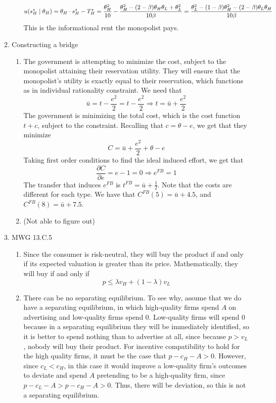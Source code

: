\documentclass[12pt]{article}
\begin{document}
\begin{enumerate}
\begin{enumerate}
		\[
		u(s^\star_H \mid \theta_H) = \theta_H \cdot s^\star_H - T^\star_H = \frac{\theta_H^2}{10} - \frac{\theta_H^2 - (2-\beta)\theta_H\theta_L + \theta_L^2}{10\beta} = \frac{\theta_L^2 - (1-\beta)\theta_H^2 - (2-\beta)\theta_L\theta_H}{10\beta}
		\]
		This is the informational rent the monopolist pays.
	\end{enumerate}
	\item Constructing a bridge
	\begin{enumerate}
		\item The government is attempting to minimize the cost, subject to the monopolist attaining their reservation utility. They will ensure that the monopolist's utility is exactly equal to their reservation, which functions as in individual rationality constraint. We need that
		\[
		\bar{u} = t  - \frac{e^2}{2} = t  - \frac{e^2}{2} \Longrightarrow t = \bar{u} + \frac{e^2}{2}
		\]
		The government is minimizing the total cost, which is the cost function $t + c$, subject to the constraint. Recalling that $c = \theta - e$, we get that they minimize
		\[
		C = \bar{u} + \frac{e^2}{2} + \theta - e
		\]
		Taking first order conditions to find the ideal induced effort, we get that
		\[
		\frac{\partial C}{\partial e} = e - 1 = 0 \Longrightarrow e^{FB} = 1
		\]
		The transfer that induces $e^{FB}$ is $t^{FB} = \bar{u} + \frac{1}{2}$. Note that the costs are different for each type. We have that $C^{FB}(5) = \bar{u} + 4.5$, and $C^{FB}(8) = \bar{u} + 7.5$.
		\item (Not able to figure out)
	\end{enumerate}
	\item MWG 13.C.5
	\begin{enumerate}
		\item Since the consumer is risk-neutral, they will buy the product if and only if its expected valuation is greater than its price. Mathematically, they will buy if and only if
		\[
		p \le \lambda v_H + (1-\lambda)v_L
		\]
		\item There can be no separating equilibrium. To see why, assume that we do have a separating equilibrium, in which high-quality firms spend $A$ on advertising and low-quality firms spend 0. Low-quality firms will spend 0 because in a separating equilibrium they will be immediately identified, so it is better to spend nothing than to advertise at all, since because $p > v_L$, nobody will buy their product. For incentive compatibility to hold for the high quality firms, it must be the case that $p - c_H - A > 0$. However, since $c_L < c_H$, in this case it would improve a low-quality firm's outcomes to deviate and spend $A$ pretending to be a high-quality firm, since $p - c_L - A > p - c_H - A > 0$. Thus, there will be deviation, so this is not a separating equilibrium.

\end{enumerate}
\end{enumerate}
\end{document}
